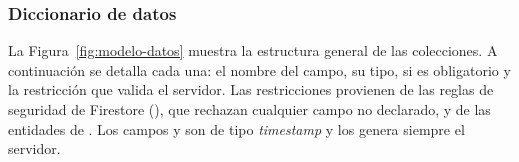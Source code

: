 \subsubsection{Diccionario de datos}
\label{subsec:diccionario-datos}

La Figura~\ref{fig:modelo-datos} muestra la estructura general de las
colecciones. A continuación se detalla cada una: el nombre del campo, su tipo,
si es obligatorio y la restricción que valida el servidor. Las restricciones
provienen de las reglas de seguridad de Firestore
(), que rechazan cualquier campo no declarado, y de
las entidades de . Los campos  y
 son de tipo \emph{timestamp} y los genera siempre el
servidor.

